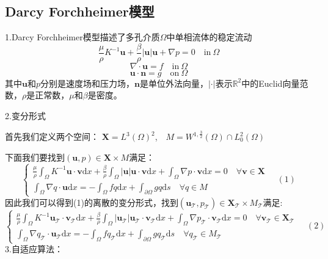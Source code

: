 \documentclass{article}
\begin{document}
\subsection{Darcy Forchheimer模型}
1.Darcy Forchheimer模型描述了多孔介质$\Omega$中单相流体的稳定流动
\begin{equation*}
\frac{\mu}{\rho}K^{-1}\boldsymbol{u}+\frac{\beta}{\rho}\left|\boldsymbol{u}\right|\boldsymbol{u}+\nabla p=0\quad\text{in}~\Omega
\end{equation*}
\begin{equation*}
\nabla\cdot\boldsymbol{u}=f \quad\text{in}~\Omega
\end{equation*}
\begin{equation*}
\boldsymbol{u}\cdot\boldsymbol{n}=g \quad\text{on}~\Omega
\end{equation*}
其中$\boldsymbol{u}$和$p$分别是速度场和压力场，$\boldsymbol{n}$是单位外法向量，$\left|\cdot\right|$表示$\mathbb{R}^2$中的Euclid向量范数，$\rho$是正常数，$\mu$和$\beta$是密度。

2.变分形式

首先我们定义两个空间：
$\boldsymbol{X}=L^3(\Omega)^2$,$\quad M=W^{1,\frac{3}{2}}(\Omega)\cap L_0^2(\Omega)$

下面我们要找到$(\boldsymbol{u},p)$$\in\boldsymbol{X}\times M$满足：
\begin{equation*}
\begin{cases}
\frac{\mu}{\rho}\int_{\Omega}K^{-1}\boldsymbol{u}\cdot\boldsymbol{v}\mathrm{d}x+\frac{\beta}{\rho}\int_{\Omega}\left|\boldsymbol{u}\right|\boldsymbol{u}\cdot\boldsymbol{v}\mathrm{d}x+\int_{\Omega}\nabla p\cdot\boldsymbol{v}\mathrm{d}x=0\quad\forall\boldsymbol{v}\in\boldsymbol{X}\\
\int_{\Omega}\nabla q\cdot\boldsymbol{u}\mathrm{d}x=-\int_{\Omega}fq\mathrm{d}x+\int_{\partial\Omega}gq\mathrm{d}s\quad\forall q\in M
\end{cases}\quad(1)
\end{equation*}
因此我们可以得到(1)的离散的变分形式，找到$(\boldsymbol{u}_{\mathcal{T}},p_{\mathcal{T}})$$\in\boldsymbol{X}_{\mathcal{T}}\times M_{\mathcal{T}}$满足:
\begin{equation*}
\begin{cases}
\frac{\mu}{\rho}\int_{\Omega}K^{-1}\boldsymbol{u}_{\mathcal{T}}\cdot\boldsymbol{v}_{\mathcal{T}}\mathrm{d}x+\frac{\beta}{\rho}\int_{\Omega}\left|\boldsymbol{u}_{\mathcal{T}}\right|\boldsymbol{u}_{\mathcal{T}}\cdot\boldsymbol{v}_{\mathcal{T}}\mathrm{d}x+\int_{\Omega}\nabla p_{\mathcal{T}}\cdot\boldsymbol{v}_{\mathcal{T}}\mathrm{d}x=0\quad\forall\boldsymbol{v}_{\mathcal{T}}\in\boldsymbol{X}_{\mathcal{T}}\\
\int_{\Omega}\nabla q_{\mathcal{T}}\cdot\boldsymbol{u}_{\mathcal{T}}\mathrm{d}x=-\int_{\Omega}fq_{\mathcal{T}}\mathrm{d}x+\int_{\partial\Omega}gq_{\mathcal{T}}\mathrm{d}s\quad\forall q_{\mathcal{T}}\in M_{\mathcal{T}}
\end{cases}\quad(2)
\end{equation*}
3.自适应算法：
\end{document}

